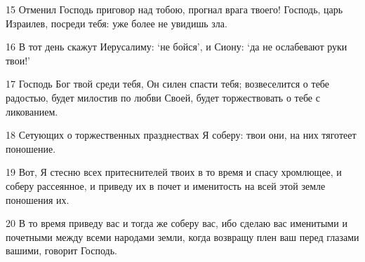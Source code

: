 \par 15 Отменил Господь приговор над тобою, прогнал врага твоего! Господь, царь Израилев, посреди тебя: уже более не увидишь зла.
\par 16 В тот день скажут Иерусалиму: `не бойся', и Сиону: `да не ослабевают руки твои!'
\par 17 Господь Бог твой среди тебя, Он силен спасти тебя; возвеселится о тебе радостью, будет милостив по любви Своей, будет торжествовать о тебе с ликованием.
\par 18 Сетующих о торжественных празднествах Я соберу: твои они, на них тяготеет поношение.
\par 19 Вот, Я стесню всех притеснителей твоих в то время и спасу хромлющее, и соберу рассеянное, и приведу их в почет и именитость на всей этой земле поношения их.
\par 20 В то время приведу вас и тогда же соберу вас, ибо сделаю вас именитыми и почетными между всеми народами земли, когда возвращу плен ваш перед глазами вашими, говорит Господь.


